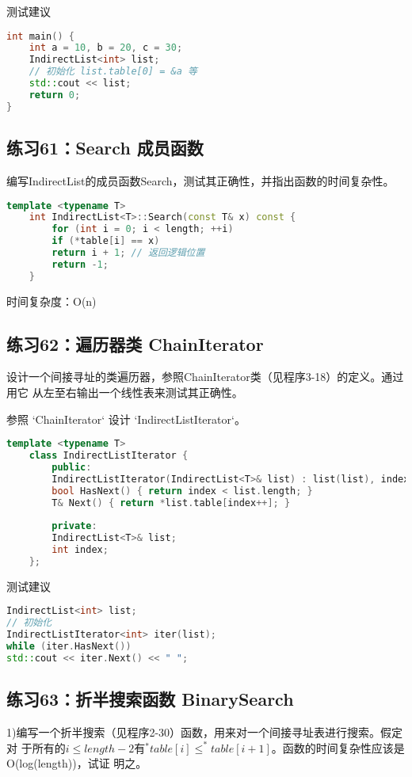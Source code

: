 \documentclass[UTF8]{ctexart}
\begin{document}
测试建议

\begin{lstlisting}[language=C++]
int main() {
	int a = 10, b = 20, c = 30;
	IndirectList<int> list;
	// 初始化 list.table[0] = &a 等
	std::cout << list;
	return 0;
}
\end{lstlisting}


\subsection*{练习61：Search 成员函数}
编写IndirectList的成员函数Search，测试其正确性，并指出函数的时间复杂性。

\begin{lstlisting}[language=C++]
	template <typename T>
	int IndirectList<T>::Search(const T& x) const {
		for (int i = 0; i < length; ++i)
		if (*table[i] == x)
		return i + 1; // 返回逻辑位置
		return -1;
	}
\end{lstlisting}

时间复杂度：O(n)


\subsection*{练习62：遍历器类 ChainIterator}
设计一个间接寻址的类遍历器，参照ChainIterator类（见程序3-18）的定义。通过用它
从左至右输出一个线性表来测试其正确性。

参照 `ChainIterator` 设计 `IndirectListIterator`。


\begin{lstlisting}[language=C++]
	template <typename T>
	class IndirectListIterator {
		public:
		IndirectListIterator(IndirectList<T>& list) : list(list), index(0) {}
		bool HasNext() { return index < list.length; }
		T& Next() { return *list.table[index++]; }
		
		private:
		IndirectList<T>& list;
		int index;
	};
\end{lstlisting}

测试建议

\begin{lstlisting}[language=C++]
IndirectList<int> list;
// 初始化
IndirectListIterator<int> iter(list);
while (iter.HasNext())
std::cout << iter.Next() << " ";
\end{lstlisting}


\subsection*{练习63：折半搜索函数 BinarySearch}
1)编写一个折半搜索（见程序2-30）函数，用来对一个间接寻址表进行搜索。假定对
于所有的$i\leq length-2$有$^*table[i]\leq ^*table[i+1]$。函数的时间复杂性应该是O(log(length))，试证
明之。
\end{document}
